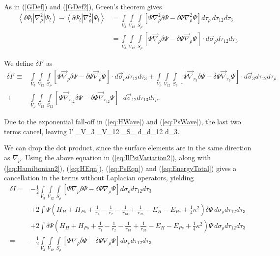 \documentclass[Dissertation.tex]{subfiles}
\begin{document}
As in (\ref{GDef}) and (\ref{GDef2}), Green's theorem gives
\begin{align}
\nonumber \left<\delta\Psi_l | \nabla_\rho^2 | \Psi_l\right> - \left<\delta\Psi_l | \nabla_\rho^2 | \Psi_l\right> 
&= \int\limits_{V_3} \int\limits_{V_{12}} \int\limits_{S_\rho} \left[ \Psi \nabla_\rho^2 \delta\Psi - \delta\Psi \nabla_\rho^2 \Psi \right] d\tau_\rho \, d\tau_{12} d\tau_3 \\
&= \int\limits_{V_3} \int\limits_{V_{12}} \int\limits_{S_\rho} \left[ \Psi \vec{\nabla}_\rho \delta\Psi - \delta\Psi \vec{\nabla}_\rho \Psi \right] \cdot d\vec{\sigma}_\rho d\tau_{12} d\tau_3
\label{eq:ComplexGreensThm}
\end{align}

We define $\delta I'$ as
\begin{align}
\nonumber \delta I' \equiv &\int\limits_{V_3} \int\limits_{V_{12}} \int\limits_{S_\rho} \left[\Psi \vec{\nabla}_\rho \delta\Psi - \delta\Psi \vec{\nabla}_\rho \Psi \right] \cdot d\vec{\sigma}_\rho d\tau_{12} d\tau_3
  + \int\limits_{V_\rho} \int\limits_{V_{12}} \int\limits_{S_3} \left[\Psi \vec{\nabla}_{r_3} \delta\Psi - \delta\Psi \vec{\nabla}_{r_3} \Psi \right] \cdot d\vec{\sigma}_3 d\tau_{12} d\tau_{\rho} \\
  + &\int\limits_{V_\rho} \int\limits_{V_{13}}\int\limits_{S_{12}} \left[\Psi \vec{\nabla}_{r_{12}} \delta\Psi - \delta\Psi \vec{\nabla}_{r_{12}} \Psi \right] \cdot d\vec{\sigma}_{12} d\tau_{13} d\tau_\rho.
\end{align}

\noindent Due to the exponential fall-off in (\ref{eq:HWave}) and (\ref{eq:PsWave}), the last two terms cancel, leaving
\beq
\nonumber \delta I' \equiv \int\limits_{V_3} \int\limits_{V_{12}} \int\limits_{S_\rho} \left[\Psi \vec{\nabla}_\rho \delta\Psi - \delta\Psi \vec{\nabla}_\rho \Psi \right] \cdot d\vec{\sigma}_\rho d\tau_{12} d\tau_3.
\eeq

We can drop the dot product, since the surface elements are in the same direction as $\nabla_\rho$.
Using the above equation in (\ref{eq:IlPsiVariation2}), along with (\ref{eq:Hamiltonian2}), (\ref{eq:HEqn}), (\ref{eq:PsEqn}) and (\ref{eq:EnergyTotal}) gives a cancellation in the terms without Laplacian operators, yielding
\begin{align}
\nonumber \delta I = &-\frac{1}{2} \int\limits_{V_3} \int\limits_{V_{12}} \int\limits_{S_\rho} \left[ \Psi \nabla_\rho \delta\Psi - \delta\Psi \nabla_\rho \Psi \right] d\sigma_\rho d\tau_{12} d\tau_3 \\
\nonumber & + 2 \int \Psi\left(H_H + H_{Ps} + \frac{1}{r_1} - \frac{1}{r_2} - \frac{1}{r_{13}} + \frac{1}{r_{23}} - E_H - E_{Ps} + \frac{1}{4} \kappa^2\right) \delta\Psi \, d\sigma_\rho d\tau_{12} d\tau_3 \\
\nonumber & + 2 \int \delta\Psi\left(H_H + H_{Ps} + \frac{1}{r_1} - \frac{1}{r_2} - \frac{1}{r_{13}} + \frac{1}{r_{23}} - E_H - E_{Ps} + \frac{1}{4} \kappa^2\right) \Psi \, d\sigma_\rho d\tau_{12} d\tau_3 \\
= &-\frac{1}{2} \int\limits_{V_3} \int\limits_{V_{12}} \int\limits_{S_\rho} \left[ \Psi \nabla_\rho \delta\Psi - \delta\Psi \nabla_\rho \Psi \right] d\sigma_\rho d\tau_{12} d\tau_3
\label{eq:ComplexIl1}
\end{align}
\end{document}

